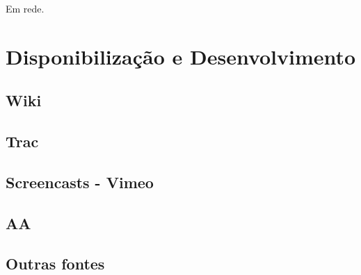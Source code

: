 Em rede.



\section{Disponibilização e Desenvolvimento}

\subsection{Wiki}

\subsection{Trac}

\subsection{Screencasts - Vimeo}

\subsection{AA}

\subsection{Outras fontes}
